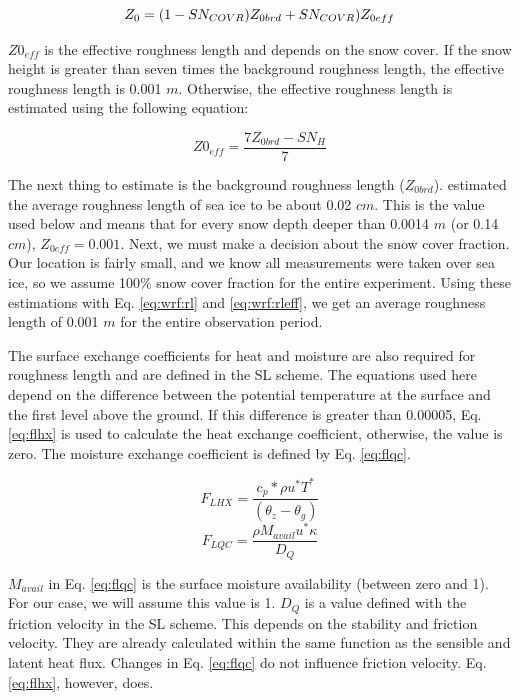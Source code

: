 {\begin{equation}\label{eq:wrf:rl}
Z_{0} = (1 - SN_{COVR}) Z_{0brd} + SN_{COVR}) \space Z_{0eff}
\end{equation}

$Z0_{eff}$ is the effective roughness length and depends on the snow cover. If the snow height is greater than seven times the background roughness length, the effective roughness length is 0.001 $m$. Otherwise, the effective roughness length is estimated using the following equation:

\begin{equation}\label{eq:wrf:rleff}
Z0_{eff} = \frac{7Z_{0brd}-SN_{H}}{7}
\end{equation}

The next thing to estimate is the background roughness length ($Z_{0brd}$). \citet{untersteiner:1965} estimated the average roughness length of sea ice to be about 0.02 $cm$. This is the value used below and means that for every snow depth deeper than 0.0014 $m$ (or 0.14 $cm$), $Z_{0eff} = 0.001$. Next, we must make a decision about the snow cover fraction. Our location is fairly small, and we know all measurements were taken over sea ice, so we assume 100$\%$ snow cover fraction for the entire experiment. Using these estimations with Eq. \ref{eq:wrf:rl} and \ref{eq:wrf:rleff}, we get an average roughness length of 0.001 $m$ for the entire observation period. 


The surface exchange coefficients for heat and moisture are also required for roughness length and are defined in the SL scheme. The equations used here depend on the difference between the potential temperature at the surface and the first level above the ground. If this difference is greater than 0.00005, Eq. \ref{eq:flhx} is used to calculate the heat exchange coefficient, otherwise, the value is zero. The moisture exchange coefficient is defined by Eq. \ref{eq:flqc}. 

\begin{equation}\label{eq:flhx}
F_{LHX} = \frac{c_{p} * \rho u^{*} T^{*}}{(\theta_{z} - \theta_{g})}
\end{equation}
\begin{equation}\label{eq:flqc}
F_{LQC} = \frac{\rho M_{avail} u^{*} \kappa}{D_{Q}}
\end{equation}

$M_{avail}$ in Eq. \ref{eq:flqc} is the surface moisture availability (between zero and 1). For our case, we will assume this value is 1. $D_{Q}$ is a value defined with the friction velocity in the SL scheme. This depends on the stability and friction velocity. They are already calculated within the same function as the sensible and latent heat flux. Changes in Eq. \ref{eq:flqc} do not influence friction velocity. Eq. \ref{eq:flhx}, however, does.

}

